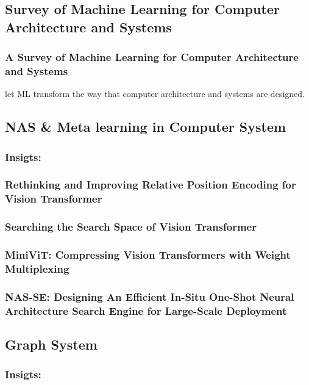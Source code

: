 \documentclass[UTF8]{article}
\begin{document}
\subsubsection{}

\subsection{Survey of Machine Learning for Computer Architecture and Systems}
\subsubsection{A Survey of Machine Learning for Computer Architecture and Systems}
let ML transform the way that computer architecture and systems are designed. 


\subsection{NAS \& Meta learning in Computer System}
\subsubsection{Insigts:}
\subsubsection{Rethinking and Improving Relative Position Encoding for Vision Transformer}
\subsubsection{Searching the Search Space of Vision Transformer}
\subsubsection{MiniViT: Compressing Vision Transformers with Weight Multiplexing}
\subsubsection{NAS-SE: Designing An Efficient In-Situ One-Shot Neural Architecture Search Engine for Large-Scale Deployment}

\subsection{Graph System}
\subsubsection{Insigts:}
\end{document}
